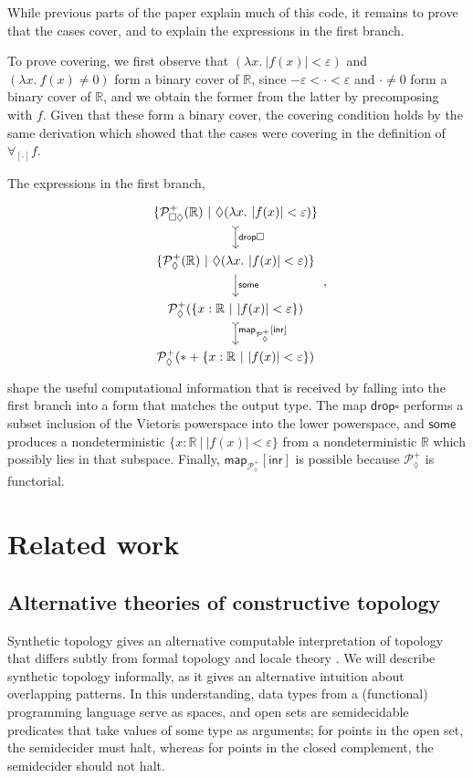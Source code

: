 \documentclass[conference]{IEEEtran}
\newcommand{\PLower}{\mathcal{P}_\lozenge}
\newcommand{\Viet}{\mathcal{P}_{\square\lozenge}}
\newcommand{\R}{\mathbb{R}}
\newcommand{\fun}[2]{\lambda {#1}.\  {#2}}
\newcommand{\suchthat}{\ |\ }
\newcommand{\One}{\ast}
\begin{document}
While previous parts of the paper explain much of this code, it remains to prove that the cases cover, and to explain the expressions in the first branch.

To prove covering, we first observe that  $(\fun{x}{|f(x)| < \varepsilon})$ and $(\fun{x}{f(x) \ne 0})$ form a binary cover of $\R$, since $- \varepsilon < \cdot < \varepsilon$ and $\cdot \neq 0$ form a binary cover of $\R$, and we obtain the former from the latter by precomposing with $f$. Given that these form a binary cover, the covering condition holds by the same derivation which showed that the cases were covering in the definition of $\forall_{[\cdot]}f$.

The expressions in the first branch,
\begin{equation*}
\begin{tikzcd}
\{ \Viet^+(\R) \suchthat \lozenge(\fun{x}{|f(x)| < \varepsilon}) \}
 \arrow[d, rightarrowtail, "\mathsf{drop}\square"]
\\ 
\{ \PLower^+(\R) \suchthat \lozenge(\fun{x}{|f(x)| < \varepsilon}) \}
 \arrow[d, "\mathsf{some}"]
\\ 
\PLower^+(\{x : \R \suchthat |f(x)| < \varepsilon \})
  \arrow[d, rightarrowtail, "\mathsf{map}_{\PLower^+}{[\mathsf{inr}]}"]
\\
\PLower^+(\One + \{x : \R \suchthat |f(x)| < \varepsilon \})
\end{tikzcd},
\end{equation*}
shape the useful computational information that is received by falling into the first branch into a form that matches the output type. The map $\mathsf{drop}\square$ performs a subset inclusion of the Vietoris powerspace into the lower powerspace, and $\mathsf{some}$ produces a nondeterministic $\{x : \R \suchthat |f(x)| < \varepsilon \}$ from a nondeterministic $\R$ which possibly lies in that subspace. Finally, $\mathsf{map}_{\PLower^+}[\mathsf{inr}]$ is possible because $\PLower^+$ is functorial.

\section{Related work}

\subsection{Alternative theories of constructive topology}

Synthetic topology gives an alternative computable interpretation of topology that differs subtly from formal topology and locale theory \cite{escardo2004, lesnik}. We will describe synthetic topology informally, as it gives an alternative intuition about overlapping patterns. In this understanding, data types from a (functional) programming language serve as spaces, and open sets are semidecidable predicates that take values of some type as arguments; for points in the open set, the semidecider must halt, whereas for points in the closed complement, the semidecider should not halt.
\end{document}
